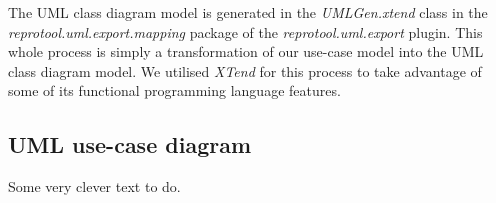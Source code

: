 The UML class diagram model is generated in the \emph{UMLGen.xtend} class in the \emph{reprotool.uml.export.mapping} package of the
\emph{reprotool.uml.export} plugin. This whole process is simply a transformation of our use-case model into the UML class diagram
model. We utilised \emph{XTend} for this process to take advantage of some of its functional programming language features.

\subsection{UML use-case diagram}
Some very clever text to do.